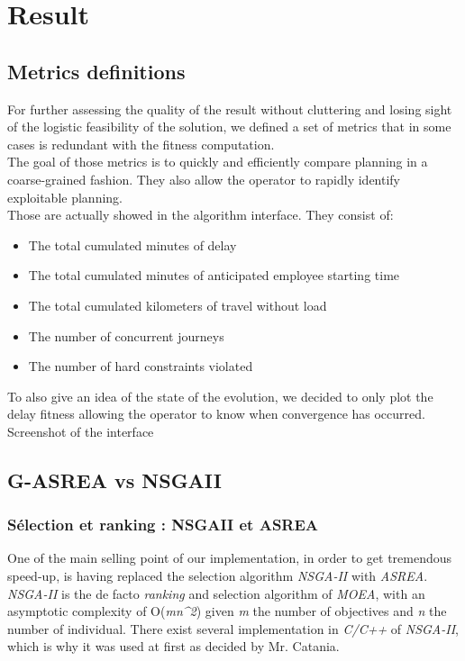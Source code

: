 \documentclass[12pt]{memoir}
\begin{document}
\section{Result}
\subsection{Metrics definitions}
For further assessing the quality of the result without cluttering and losing sight
of the logistic feasibility of the solution, we defined a set of metrics that in some
cases is redundant with the fitness computation. \\
The goal of those metrics is to quickly and efficiently compare planning in a coarse-grained
fashion. They also allow the operator to rapidly identify exploitable planning.\\
Those are actually showed in the algorithm interface. They consist of: 
\begin{itemize}
  \item The total cumulated minutes of delay
  \item The total cumulated minutes of anticipated employee starting time
  \item The total cumulated kilometers of travel without load
  \item The number of concurrent journeys
  \item The number of hard constraints violated
\end{itemize}
To also give an idea of the state of the evolution, we decided to only plot the delay
fitness allowing the operator to know when convergence has occurred.
Screenshot of the interface
\subsection{G-ASREA vs NSGAII}
\subsubsection{Sélection et ranking : NSGAII et
	ASREA}\label{suxe9lection-et-ranking-nsgaii-et-asrea}

One of the main selling point of our implementation, in order to get tremendous speed-up,
is having replaced the selection algorithm \emph{NSGA-II\cite{deb2002fast}} with \emph{ASREA\cite{sharma2010archived,tsutsui2013massively}}.\\

\emph{NSGA-II} is the de facto \emph{ranking} and selection algorithm of
\emph{MOEA}, with an asymptotic complexity of O(\emph{mn\^{}2}) given \emph{m}
the number of objectives and \emph{n} the number of individual.
There exist several implementation in \emph{C/C++} of \emph{NSGA-II}, which is
why it was used at first as decided by  Mr. Catania.\\
\end{document}
